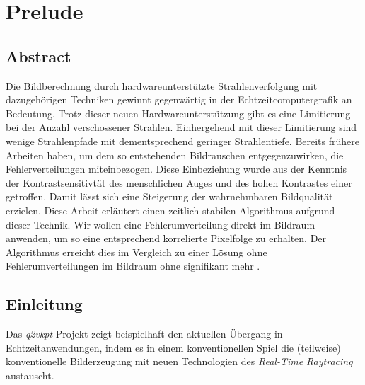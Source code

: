 \newcommand{\uproman}[1]{\uppercase\expandafter{\romannumeral#1}}
\newcommand{\lowroman}[1]{\romannumeral#1\relax}

\chapter{Prelude}
\label{ch:Introduction}

\section{Abstract}

\vspace*{\fill}

Die Bildberechnung durch hardwareunterstützte Strahlenverfolgung mit dazugehörigen Techniken gewinnt gegenwärtig in der Echtzeitcomputergrafik an Bedeutung. 
Trotz dieser neuen Hardwareunterstützung gibt es eine Limitierung bei der Anzahl verschossener Strahlen. Einhergehend mit dieser Limitierung sind 
wenige Strahlenpfade mit dementsprechend geringer Strahlentiefe. Bereits frühere Arbeiten haben, um dem so entstehenden Bildrauschen entgegenzuwirken,
die  Fehlerverteilungen miteinbezogen. Diese Einbeziehung wurde aus der Kenntnis der Kontrastsensitivtät des menschlichen Auges
und des hohen Kontrastes einer  getroffen. Damit lässt sich eine Steigerung der wahrnehmbaren Bildqualität erzielen.
Diese Arbeit erläutert einen zeitlich stabilen Algorithmus aufgrund dieser Technik. Wir wollen eine Fehlerumverteilung direkt im Bildraum anwenden, um so eine entsprechend 
korrelierte Pixelfolge zu erhalten. Der Algorithmus erreicht dies im Vergleich zu einer Lösung ohne Fehlerumverteilungen im Bildraum ohne signifikant mehr
.
\vfill

\newpage

\section{Einleitung}
\vspace*{\fill}

Das \textit{q2vkpt}-Projekt \cite{Sch19} zeigt beispielhaft den aktuellen Übergang in Echtzeitanwendungen, indem es in einem konventionellen Spiel die (teilweise) konventionelle Bilderzeugung 
mit neuen Technologien des \textit{Real-Time Raytracing} austauscht.

